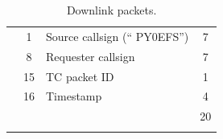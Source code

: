 \begin{longtable}[c]{lcL{0.4\textwidth}c}
                                            & 1  & Source callsign (`` PY0EFS'')        & 7 \\
                                            & 8  & Requester callsign                   & 7 \\
                                            & 15 & TC packet ID                         & 1 \\
                                            & 16 & Timestamp                            & 4 \\
                                            &    &                                      & 20 \\
    \bottomrule[1.5pt]
    \caption{Downlink packets.}
    \label{tab:downlink-packets}
\end{longtable}

